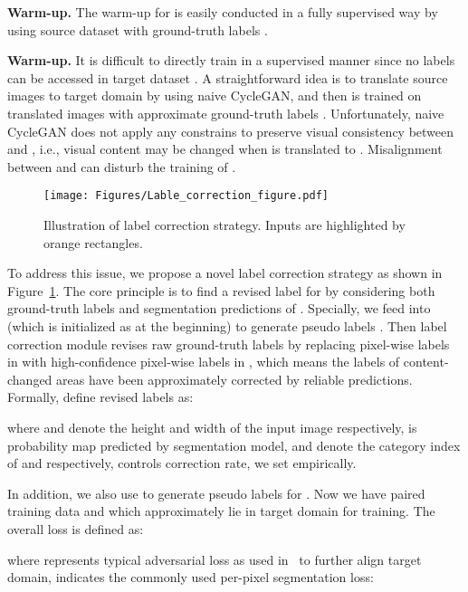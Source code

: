 \documentclass[10pt,twocolumn,letterpaper]{article}
\begin{document}
\noindent\textbf{ Warm-up.} 
The warm-up for  is easily conducted in a fully supervised way by using source dataset  with ground-truth labels . 

\noindent\textbf{ Warm-up.}
It is difficult to directly train  in a supervised manner since no labels can be accessed in target dataset . A straightforward idea is to translate source images  to target domain by using naive CycleGAN, and then  is trained on translated images  with approximate ground-truth labels . Unfortunately, naive CycleGAN does not apply any constrains to preserve visual consistency between  and , i.e., visual content may be changed when  is translated to . Misalignment between  and  can disturb the training of .

\begin{figure}[t]
	
    \centering 
  \texttt{[image: Figures/Lable\_correction\_figure.pdf]}
  
    \caption{Illustration of label correction strategy. Inputs are highlighted by orange rectangles.}

 \label{fig:initialazion_T}
 \setlength{\belowcaptionskip}{-2cm}
 \vspace{-0.7cm}
\end{figure}

To address this issue, we propose a novel label correction strategy as shown in Figure~\ref{fig:initialazion_T}. The core principle is to find a revised label  for  by considering both ground-truth labels  and segmentation predictions of . Specially, we feed  into  (which is initialized as  at the beginning) to generate pseudo labels . Then label correction module revises raw ground-truth labels  by replacing pixel-wise labels in  with high-confidence pixel-wise labels in , which means the labels of content-changed areas have been approximately corrected by reliable predictions. Formally, define revised labels  as:

where  and  denote the height and width of the input image respectively,  is probability map predicted by segmentation model,  and  denote the category index of  and  respectively,  controls correction rate, we set  empirically.

In addition, we also use  to generate pseudo labels  for . Now we have paired training data  and  which approximately lie in target domain for  training. The overall loss is defined as:

where  represents typical adversarial loss as used in~\cite{tsai2018learning,li2019bidirectional,yang2020label} to further align target domain,  indicates the commonly used per-pixel segmentation loss: 
\end{document}
